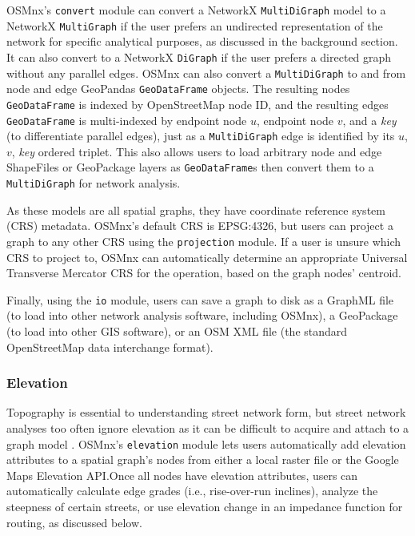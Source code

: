 \documentclass[12pt,letterpaper]{article} %
\begin{document}
OSMnx's \texttt{convert} module can convert a NetworkX \texttt{MultiDiGraph} model to a NetworkX \texttt{MultiGraph} if the user prefers an undirected representation of the network for specific analytical purposes, as discussed in the background section. It can also convert to a NetworkX \texttt{DiGraph} if the user prefers a directed graph without any parallel edges. OSMnx can also convert a \texttt{MultiDiGraph} to and from node and edge GeoPandas \texttt{GeoDataFrame} objects. The resulting nodes \texttt{GeoDataFrame} is indexed by OpenStreetMap node ID, and the resulting edges \texttt{GeoDataFrame} is multi-indexed by endpoint node $u$, endpoint node $v$, and a \textit{key} (to differentiate parallel edges), just as a \texttt{MultiDiGraph} edge is identified by its $u$, $v$, \textit{key} ordered triplet. This also allows users to load arbitrary node and edge ShapeFiles or GeoPackage layers as \texttt{GeoDataFrame}s then convert them to a \texttt{MultiDiGraph} for network analysis.

As these models are all spatial graphs, they have coordinate reference system (CRS) metadata. OSMnx's default CRS is EPSG:4326, but users can project a graph to any other CRS using the \texttt{projection} module. If a user is unsure which CRS to project to, OSMnx can automatically determine an appropriate Universal Transverse Mercator CRS for the operation, based on the graph nodes' centroid.

Finally, using the \texttt{io} module, users can save a graph to disk as a GraphML file (to load into other network analysis software, including OSMnx), a GeoPackage (to load into other GIS software), or an OSM XML file (the standard OpenStreetMap data interchange format).

\subsubsection{Elevation}

Topography is essential to understanding street network form, but street network analyses too often ignore elevation as it can be difficult to acquire and attach to a graph model \citep{boeing_street_2022}. OSMnx's \texttt{elevation} module lets users automatically add elevation attributes to a spatial graph's nodes from either a local raster file or the Google Maps Elevation API.\@ Once all nodes have elevation attributes, users can automatically calculate edge grades (i.e., rise-over-run inclines), analyze the steepness of certain streets, or use elevation change in an impedance function for routing, as discussed below.
\end{document}
